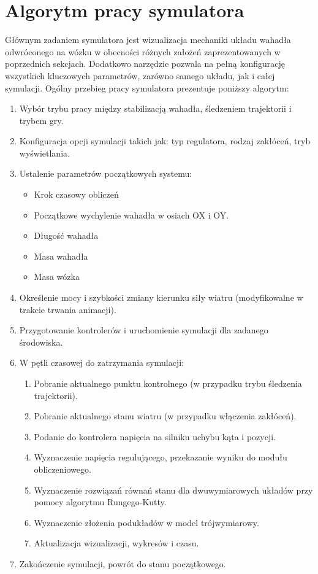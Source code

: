 \documentclass[12pt, oneside]{report}
\theoremstyle{definition}
\begin{document}
\section{Algorytm pracy symulatora}
Głównym zadaniem symulatora jest wizualizacja mechaniki układu wahadła odwróconego na wózku w obecności różnych założeń zaprezentowanych w poprzednich sekcjach. Dodatkowo narzędzie pozwala na pełną konfigurację wszystkich kluczowych parametrów, zarówno samego układu, jak i całej symulacji. Ogólny przebieg pracy symulatora prezentuje poniższy algorytm:
\begin{enumerate}
\item Wybór trybu pracy między stabilizacją wahadła, śledzeniem trajektorii i trybem gry.
\item Konfiguracja opcji symulacji takich jak: typ regulatora, rodzaj zakłóceń, tryb wyświetlania.
\item Ustalenie parametrów początkowych systemu:
\begin{itemize}
\item Krok czasowy obliczeń
\item Początkowe wychylenie wahadła w osiach OX i OY.
\item Długość wahadła
\item Masa wahadła
\item Masa wózka
\end{itemize}
\item Określenie mocy i szybkości zmiany kierunku siły wiatru (modyfikowalne w trakcie trwania animacji).
\item Przygotowanie kontrolerów i uruchomienie symulacji dla zadanego środowiska.
\item W pętli czasowej do zatrzymania symulacji:
\begin{enumerate}
\item Pobranie aktualnego punktu kontrolnego (w przypadku trybu śledzenia trajektorii).
\item Pobranie aktualnego stanu wiatru (w przypadku włączenia zakłóceń).
\item Podanie do kontrolera napięcia na silniku uchybu kąta i pozycji.
\item Wyznaczenie napięcia regulującego, przekazanie wyniku do modułu obliczeniowego.
\item Wyznaczenie rozwiązań równań stanu dla dwuwymiarowych układów przy pomocy algorytmu Rungego-Kutty.
\item Wyznaczenie złożenia podukładów w model trójwymiarowy.
\item Aktualizacja wizualizacji, wykresów i czasu.
\end{enumerate}
\item Zakończenie symulacji, powrót do stanu początkowego.
\end{enumerate}
\end{document}
